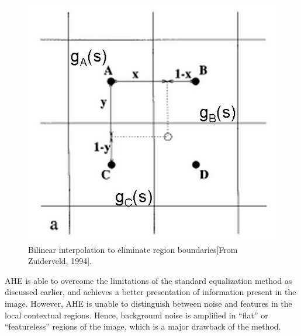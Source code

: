 \begin{figure}
	\centering
	\includegraphics[scale=0.7]{images/ch3/bilinearInterpolation.jpg}
	\caption{Bilinear interpolation to eliminate region boundaries[From Zuiderveld, 1994].}
	\label{fig:bilinearInterpolation}
\end{figure}

AHE is able to overcome the limitations of the standard equalization
method as discussed earlier, and achieves a better presentation of information
present in the image. However, AHE is unable to distinguish between noise and
features in the local contextual regions. Hence, background noise is amplified in
“flat” or “featureless” regions of the image, which is a major drawback of the
method.

